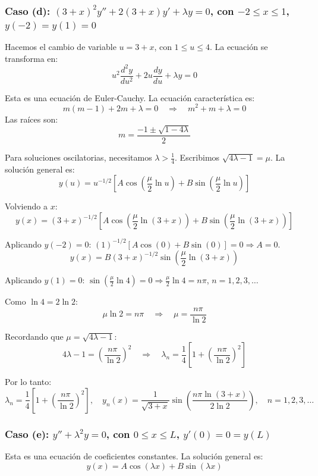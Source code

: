 \documentclass[a4paper]{article}
\begin{document}
\subsubsection{Caso (d): $(3+x)^2y'' + 2(3+x)y' + \lambda y = 0$, con $-2 \leq x \leq 1$, $y(-2) = y(1) = 0$}

Hacemos el cambio de variable $u = 3+x$, con $1 \leq u \leq 4$. La ecuación se transforma en:
$$
u^2 \frac{d^2y}{du^2} + 2u \frac{dy}{du} + \lambda y = 0
$$

Esta es una ecuación de Euler-Cauchy. La ecuación característica es:
$$
m(m-1) + 2m + \lambda = 0 \quad \Rightarrow \quad m^2 + m + \lambda = 0
$$
Las raíces son:
$$
m = \frac{-1 \pm \sqrt{1 - 4\lambda}}{2}
$$

Para soluciones oscilatorias, necesitamos $\lambda > \frac{1}{4}$. Escribimos $\sqrt{4\lambda - 1} = \mu$. La solución general es:
$$
y(u) = u^{-1/2}\left[A \cos\left(\frac{\mu}{2} \ln u\right) + B \sin\left(\frac{\mu}{2} \ln u\right)\right]
$$

Volviendo a $x$:
$$
y(x) = (3+x)^{-1/2}\left[A \cos\left(\frac{\mu}{2} \ln(3+x)\right) + B \sin\left(\frac{\mu}{2} \ln(3+x)\right)\right]
$$

Aplicando $y(-2) = 0$: $(1)^{-1/2}[A \cos(0) + B \sin(0)] = 0 \Rightarrow A = 0$.
$$
y(x) = B (3+x)^{-1/2} \sin\left(\frac{\mu}{2} \ln(3+x)\right)
$$

Aplicando $y(1) = 0$: $\sin\left(\frac{\mu}{2} \ln 4\right) = 0 \Rightarrow \frac{\mu}{2} \ln 4 = n\pi$, $n = 1, 2, 3, \dots$

Como $\ln 4 = 2\ln 2$:
$$
\mu \ln 2 = n\pi \quad \Rightarrow \quad \mu = \frac{n\pi}{\ln 2}
$$

Recordando que $\mu = \sqrt{4\lambda - 1}$:
$$
4\lambda - 1 = \left(\frac{n\pi}{\ln 2}\right)^2 \quad \Rightarrow \quad \lambda_n = \frac{1}{4}\left[1 + \left(\frac{n\pi}{\ln 2}\right)^2\right]
$$

Por lo tanto:
$$
\boxed{\lambda_n = \frac{1}{4}\left[1 + \left(\frac{n\pi}{\ln 2}\right)^2\right], \quad y_n(x) = \frac{1}{\sqrt{3+x}} \sin\left(\frac{n\pi \ln(3+x)}{2\ln 2}\right), \quad n = 1, 2, 3, \dots}
$$

\subsubsection{Caso (e): $y'' + \lambda^2 y = 0$, con $0 \leq x \leq L$, $y'(0) = 0 = y(L)$}

Esta es una ecuación de coeficientes constantes. La solución general es:
$$
y(x) = A \cos(\lambda x) + B \sin(\lambda x)
$$
\end{document}
